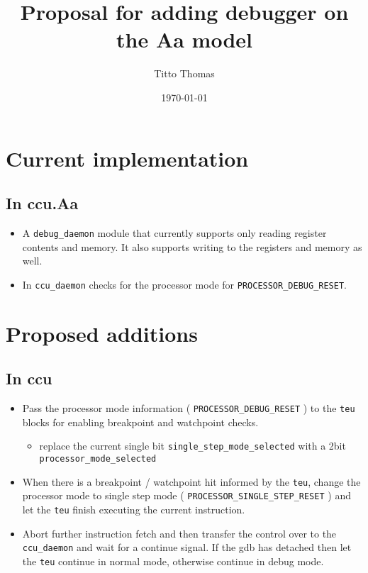 \documentclass[a4paper, 11pt]{article}
\title{Proposal for adding debugger on the Aa model}
\author{Titto Thomas}
\date{\today}
\begin{document}
\maketitle

\section*{Current implementation}
\label{sec:current}

\subsection*{In ccu.Aa}
\begin{itemize}
\item A \texttt{debug\_daemon} module that currently supports only reading register contents and memory. It also supports writing to the registers and memory as well.

\item In \texttt{ccu\_daemon} checks for the processor mode for \texttt{PROCESSOR\_DEBUG\_RESET}.
\end{itemize}

\section*{Proposed additions}
\label{sec:proposal}

\subsection*{In ccu}
\begin{itemize}
\item Pass the processor mode information ( \texttt{PROCESSOR\_DEBUG\_RESET} ) to the \texttt{teu} blocks for enabling breakpoint and watchpoint checks.

	\begin{itemize}
	\item replace the current single bit \texttt{single\_step\_mode\_selected} with a 2bit \texttt{processor\_mode\_selected}
	\end{itemize}

\item When there is a breakpoint / watchpoint hit informed by the \texttt{teu}, change the processor mode to single step mode ( \texttt{PROCESSOR\_SINGLE\_STEP\_RESET} ) and let the \texttt{teu} finish executing the current instruction.

\item Abort further instruction fetch and then transfer the control over to the \texttt{ccu\_daemon} and wait for a continue signal. If the gdb has detached then let the \texttt{teu} continue in normal mode, otherwise continue in debug mode.
\end{itemize}
\end{document}
